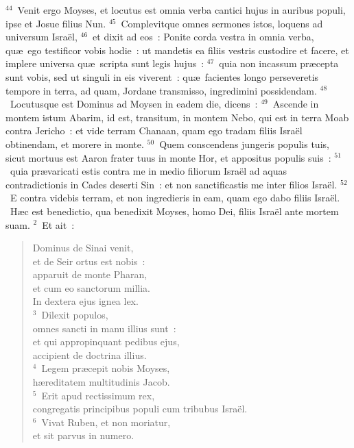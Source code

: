 ${}^{44}$~Venit ergo Moyses, et locutus est omnia verba cantici hujus in auribus populi, ipse et Josue filius Nun.
${}^{45}$~Complevitque omnes sermones istos, loquens ad universum Isra\"el,
${}^{46}$~et dixit ad eos~: Ponite corda vestra in omnia verba, qu\ae\ ego testificor vobis hodie~: ut mandetis ea filiis vestris custodire et facere, et implere universa qu\ae\ scripta sunt legis hujus~:
${}^{47}$~quia non incassum pr\ae cepta sunt vobis, sed ut singuli in eis viverent~: qu\ae\ facientes longo perseveretis tempore in terra, ad quam, Jordane transmisso, ingredimini possidendam.
${}^{48}$~Locutusque est Dominus ad Moysen in eadem die, dicens~:
${}^{49}$~Ascende in montem istum Abarim, id est, transitum, in montem Nebo, qui est in terra Moab contra Jericho~: et vide terram Chanaan, quam ego tradam filiis Isra\"el obtinendam, et morere in monte.
${}^{50}$~Quem conscendens jungeris populis tuis, sicut mortuus est Aaron frater tuus in monte Hor, et appositus populis suis~:
${}^{51}$~quia pr\ae varicati estis contra me in medio filiorum Isra\"el ad aquas contradictionis in Cades deserti Sin~: et non sanctificastis me inter filios Isra\"el.
${}^{52}$~E contra videbis terram, et non ingredieris in eam, quam ego dabo filiis Isra\"el.
~H\ae c est benedictio, qua benedixit Moyses, homo Dei, filiis Isra\"el ante mortem suam.
${}^{2}$~Et ait~: \begin{flushleft}\begin{verse}Dominus de Sinai venit,\\ et de Seir ortus est nobis~:\\ apparuit de monte Pharan,\\ et cum eo sanctorum millia.\\ In dextera ejus ignea lex.\\
${}^{3}$~Dilexit populos,\\ omnes sancti in manu illius sunt~:\\ et qui appropinquant pedibus ejus,\\ accipient de doctrina illius.\\
${}^{4}$~Legem pr\ae cepit nobis Moyses,\\ h\ae reditatem multitudinis Jacob.\\
${}^{5}$~Erit apud rectissimum rex,\\ congregatis principibus populi cum tribubus Isra\"el.\\
${}^{6}$~Vivat Ruben, et non moriatur,\\ et sit parvus in numero.\end{verse}\end{flushleft}


